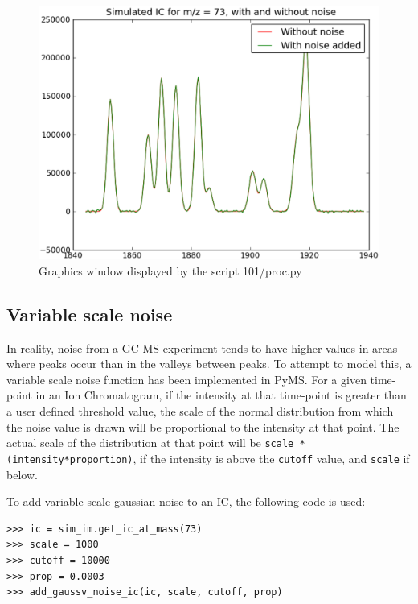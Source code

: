 \begin{figure}[h]
  \begin{center}
    \includegraphics[scale=0.25]{graphics/chapter10/test-101.eps}
  \end{center}
  \caption{Graphics window displayed by the script 101/proc.py}
  \label{fig:gaussc-noise-ic}
\end{figure}


\subsection{Variable scale noise}
\label{subsec:gaussv-noise-ic}


In reality, noise from a GC-MS experiment tends to have higher values in areas where peaks occur than in
the valleys between peaks. To attempt to model this, a variable scale noise function has been implemented in
PyMS. For a given time-point in an Ion Chromatogram, if the intensity at that time-point is greater than
a user defined threshold value, the scale of the normal distribution from which the noise value is drawn will be 
proportional to the intensity at that point. The actual scale of the distribution at that point will be
{\tt scale * (intensity*proportion)}, if the intensity is above the {\tt cutoff} value, and {\tt scale} if below.

To add variable scale gaussian noise to an IC, the following code is used:

\begin{verbatim}
>>> ic = sim_im.get_ic_at_mass(73)
>>> scale = 1000
>>> cutoff = 10000
>>> prop = 0.0003
>>> add_gaussv_noise_ic(ic, scale, cutoff, prop)
\end{verbatim}


